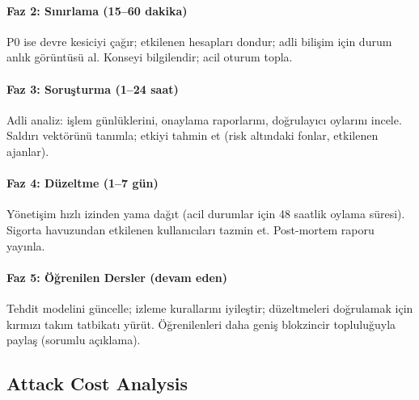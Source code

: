 \documentclass[11pt]{article}
\begin{document}
\begin{itemize}[noitemsep]
\begin{itemize}[noitemsep]
\begin{itemize}[noitemsep]
\begin{itemize}[noitemsep]
\begin{itemize}[noitemsep]
\begin{itemize}[noitemsep]
\begin{itemize}[noitemsep]
\begin{enumerate}[noitemsep]
\begin{itemize}[noitemsep]
\paragraph{Faz 2: Sınırlama (15--60 dakika)}
P0 ise devre kesiciyi çağır; etkilenen hesapları dondur; adli bilişim için durum anlık görüntüsü al. Konseyi bilgilendir; acil oturum topla.

\paragraph{Faz 3: Soruşturma (1--24 saat)}
Adli analiz: işlem günlüklerini, onaylama raporlarını, doğrulayıcı oylarını incele. Saldırı vektörünü tanımla; etkiyi tahmin et (risk altındaki fonlar, etkilenen ajanlar).

\paragraph{Faz 4: Düzeltme (1--7 gün)}
Yönetişim hızlı izinden yama dağıt (acil durumlar için 48 saatlik oylama süresi). Sigorta havuzundan etkilenen kullanıcıları tazmin et. Post-mortem raporu yayınla.

\paragraph{Faz 5: Öğrenilen Dersler (devam eden)}
Tehdit modelini güncelle; izleme kurallarını iyileştir; düzeltmeleri doğrulamak için kırmızı takım tatbikatı yürüt. Öğrenilenleri daha geniş blokzincir topluluğuyla paylaş (sorumlu açıklama).

\subsection{Attack Cost Analysis}


\end{itemize}
\end{enumerate}
\end{itemize}
\end{itemize}
\end{itemize}
\end{itemize}
\end{itemize}
\end{itemize}
\end{itemize}
\end{document}
